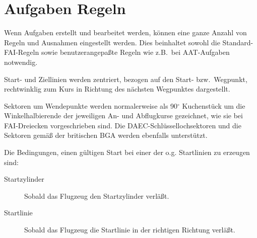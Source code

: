 \section{Aufgaben Regeln}\label{sec:task-rules}
Wenn Aufgaben erstellt und bearbeitet werden, können eine ganze Anzahl  von Regeln und Ausnahmen  eingestellt werden. Dies beinhaltet sowohl die Standard-FAI-Regeln sowie benutzerangepaßte Regeln wie z.B.\ bei AAT-Aufgaben notwendig.

Start- und Ziellinien werden zentriert, bezogen auf den Start- bzw.\  Wegpunkt, rechtwinklig zum Kurs in Richtung des nächsten Wegpunktes dargestellt.

 Sektoren um Wendepunkte werden normalerweise als 90$^\circ$ Kuchenstück um die Winkelhalbierende der jeweiligen An- und Abflugkurse gezeichnet, wie sie bei FAI-Dreiecken vorgeschrieben sind.
 Die DAEC-Schlüssellochsektoren und die Sektoren gemäß der britischen BGA werden ebenfalls unterstützt.

Die Bedingungen, einen gültigen Start bei einer der o.g. Startlinien zu erzeugen sind:
\begin{description}
\item[Startzylinder] Sobald das Flugzeug den Startzylinder verläßt.
\item[Startlinie] Sobald das Flugzeug die Startlinie in der richtigen Richtung verläßt.
\end{description}

